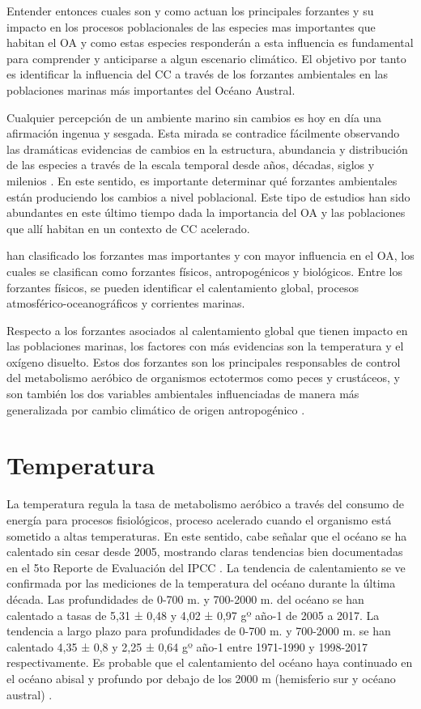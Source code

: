 \documentclass{sydneythesis}
\begin{document}
Entender entonces cuales son y como actuan los principales forzantes y su impacto en los procesos poblacionales de las especies mas importantes que habitan el OA y como estas especies responderán a esta influencia es fundamental para comprender y anticiparse a algun escenario climático. El objetivo por tanto es identificar la influencia del CC a través de los forzantes ambientales en las poblaciones marinas más importantes del Océano Austral.

\pagebreak

Cualquier percepción de un ambiente marino sin cambios es hoy en día una afirmación ingenua y sesgada. Esta mirada se contradice fácilmente observando las dramáticas evidencias de cambios en la estructura, abundancia y distribución de las especies a través de la escala temporal desde años, décadas, siglos y milenios \autocite{Pinsky2020}. En este sentido, es importante determinar qué forzantes ambientales están produciendo los cambios a nivel poblacional. Este tipo de estudios han sido abundantes en este último tiempo dada la importancia del OA y las poblaciones que allí habitan en un contexto de CC acelerado.

\autocite{Morley2020} han clasificado los forzantes mas importantes y con mayor influencia en el OA, los cuales se clasifican como forzantes físicos, antropogénicos y biológicos. Entre los forzantes físicos, se pueden identificar el calentamiento global, procesos atmosférico-oceanográficos y corrientes marinas.

Respecto a los forzantes asociados al calentamiento global que tienen impacto en las poblaciones marinas, los factores con más evidencias son la temperatura y el oxígeno disuelto. Estos dos forzantes son los principales responsables de control del metabolismo aeróbico de organismos ectotermos como peces y crustáceos, y son también los dos variables ambientales influenciadas de manera más generalizada por cambio climático de origen antropogénico \autocite{Duncan2020}.

\hypertarget{temperatura}{%
\section{Temperatura}\label{temperatura}}

La temperatura regula la tasa de metabolismo aeróbico a través del consumo de energía para procesos fisiológicos, proceso acelerado cuando el organismo está sometido a altas temperaturas. En este sentido, cabe señalar que el océano se ha calentado sin cesar desde 2005, mostrando claras tendencias bien documentadas en el 5to Reporte de Evaluación del IPCC \autocite{IPCC2014}. La tendencia de calentamiento se ve confirmada por las mediciones de la temperatura del océano durante la última década. Las profundidades de 0-700 m. y 700-2000 m. del océano se han calentado a tasas de 5,31 ± 0,48 y 4,02 ± 0,97 gº año-1 de 2005 a 2017. La tendencia a largo plazo para profundidades de 0-700 m. y 700-2000 m. se han calentado 4,35 ± 0,8 y 2,25 ± 0,64 gº año-1 entre 1971-1990 y 1998-2017 respectivamente. Es probable que el calentamiento del océano haya continuado en el océano abisal y profundo por debajo de los 2000 m (hemisferio sur y océano austral) \autocite{Bindoff2019}.
\end{document}

